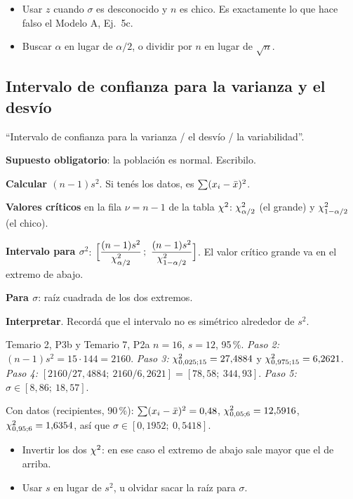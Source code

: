 \begin{ojo}
\begin{itemize}
\item Usar $z$ cuando $\sigma$ es desconocido y $n$ es chico. Es exactamente lo que hace falso el Modelo A, Ej.\ 5c.
\item Buscar $\alpha$ en lugar de $\alpha/2$, o dividir por $n$ en lugar de $\sqrt n$.
\end{itemize}
\end{ojo}

\subsection{Intervalo de confianza para la varianza y el desvío}\label{p:icvar}
\begin{cuando}
``Intervalo de confianza para la varianza / el desvío / la variabilidad''.
\end{cuando}
\begin{pasos}
\begin{pasolista}
\item \textbf{Supuesto obligatorio}: la población es normal. Escribilo.
\item \textbf{Calcular $(n-1)s^2$}. Si tenés los datos, es $\sum(x_i-\bar{x})^2$.
\item \textbf{Valores críticos} en la fila $\nu=n-1$ de la tabla $\chi^2$: $\chi^2_{\alpha/2}$ (el grande) y $\chi^2_{1-\alpha/2}$ (el chico).
\item \textbf{Intervalo para $\sigma^2$}: $\Big[\dfrac{(n-1)s^2}{\chis_{\alpha/2}}\,;\ \dfrac{(n-1)s^2}{\chis_{1-\alpha/2}}\Big]$. El valor crítico grande va en el extremo de abajo.
\item \textbf{Para $\sigma$}: raíz cuadrada de los dos extremos.
\item \textbf{Interpretar}. Recordá que el intervalo no es simétrico alrededor de $s^2$.
\end{pasolista}
\end{pasos}
\begin{modelo}{Temario 2, P3b y Temario 7, P2a}
$n=16$, $s=12$, 95\,\%. \emph{Paso 2:} $(n-1)s^2=15\cdot144=2160$. \emph{Paso 3:} $\chi^2_{0,025;15}=27{,}4884$ y $\chi^2_{0,975;15}=6{,}2621$.
\emph{Paso 4:} $[2160/27{,}4884;\ 2160/6{,}2621]=[78{,}58;\ 344{,}93]$. \emph{Paso 5:} $\sigma\in[8{,}86;\ 18{,}57]$.

Con datos (recipientes, 90\,\%): $\sum(x_i-\bar{x})^2=0{,}48$, $\chi^2_{0,05;6}=12{,}5916$, $\chi^2_{0,95;6}=1{,}6354$, así que $\sigma\in[0{,}1952;\ 0{,}5418]$.
\end{modelo}
\begin{ojo}
\begin{itemize}
\item Invertir los dos $\chi^2$: en ese caso el extremo de abajo sale mayor que el de arriba.
\item Usar $s$ en lugar de $s^2$, u olvidar sacar la raíz para $\sigma$.
\end{itemize}
\end{ojo}

